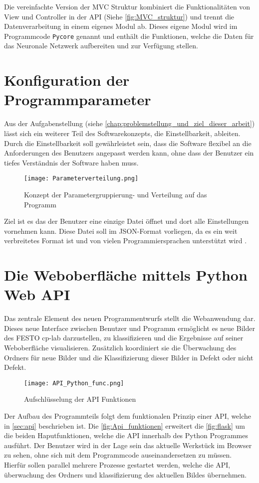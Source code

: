 Die vereinfachte Version der \ac{MVC} Struktur kombiniert die Funktionalitäten von View und Controller in der \ac{API} (Siehe \autoref{fig:MVC_struktur}) und trennt die Datenverarbeitung in einem eigenes Modul ab. Dieses eigene Modul wird im Programmcode \texttt{Pycore} genannt und enthält die Funktionen, welche die Daten für das Neuronale Netzwerk aufbereiten und zur Verfügung stellen.

\section{Konfiguration der Programmparameter} \label{sec:konfiguration}

Aus der Aufgabenstellung (siehe \autoref{chap:problemstellung_und_ziel_dieser_arbeit}) lässt sich ein weiterer Teil des Softwarekonzepts, die Einstellbarkeit, ableiten.
Durch die Einstellbarkeit soll gewährleistet sein, dass die Software flexibel an die Anforderungen des Benutzers angepasst werden kann, ohne dass der Benutzer ein tiefes Verständnis der Software haben muss.

\begin{figure}[H]
    \centering
    \texttt{[image: Parameterverteilung.png]}
    \caption{Konzept der Parametergruppierung- und Verteilung auf das Programm} 
    \label{fig:json_example}
\end{figure}

Ziel ist es das der Benutzer eine einzige Datei öffnet und dort alle Einstellungen vornehmen kann. 
Diese Datei soll im \ac{JSON}-Format vorliegen, da es ein weit verbreitetes Format ist und von vielen Programmiersprachen unterstützt wird \cite{gur_diskussion_2024}.


\section{Die Weboberfläche mittels Python Web API} \label{sec:weboberflaeche}

Das zentrale Element des neuen Programmentwurfs stellt die Webanwendung dar. Dieses neue Interface zwischen Benutzer und Programm ermöglicht es neue Bilder des FESTO \ac{cp-lab} darzustellen, zu klassifizieren und die Ergebnisse auf seiner Weboberfläche visualisieren.
Zusätzlich koordiniert sie die Überwachung des Ordners für neue Bilder und die Klassifizierung dieser Bilder in Defekt oder nicht Defekt.

\begin{figure}[H]
    \centering
    \texttt{[image: API\_Python\_func.png]}
    \caption{Aufschlüsselung der API Funktionen} 
    \label{fig:Api_funktionen}
\end{figure}

Der Aufbau des Programmteils folgt dem funktionalen Prinzip einer \ac{API}, welche in \autoref{sec:api} beschrieben ist. Die \autoref{fig:Api_funktionen} erweitert die \autoref{fig:flask} um die beiden Haputfunktionen, welche die API innerhalb des Python Programmes ausführt. Der Benutzer wird in der Lage sein das aktuelle Werkstück im Browser zu sehen, ohne sich mit dem Programmcode auseinandersetzen zu müssen. Hierfür sollen parallel mehrere Prozesse gestartet werden, welche die API, überwachung des Ordners und klassifizierung des aktuellen Bildes übernehmen.